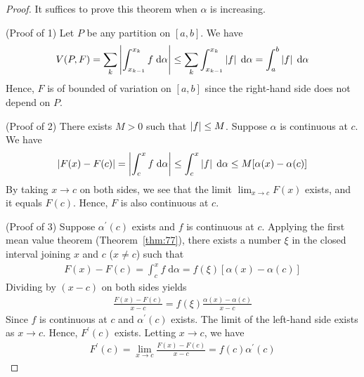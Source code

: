 \documentclass[thmcnt=section, 12pt]{my-elegantbook}
\begin{document}
\begin{proof}
    It suffices to prove this theorem when $\alpha$ is increasing.

    (Proof of 1) Let $P$ be any partition on $[a, b]$.
    We have
    \begin{align*}
        V(P,F) = \sum_{k} \left\lvert 
            \int_{x_{k-1}}^{x_k} f \; \mathrm{d} \alpha
         \right\rvert
        \leq \sum_{k}
        \int_{x_{k-1}}^{x_k} \left\lvert f \right\rvert \; \mathrm{d} \alpha
        = \int_{a}^{b} \left\lvert f \right\rvert \; \mathrm{d} \alpha
    \end{align*}
    Hence, $F$ is of bounded of variation on $[a, b]$
    since the right-hand side does not depend on $P$.

    (Proof of 2) There exists $M > 0$ such that $\left\lvert f \right\rvert \leq M$.
    Suppose $\alpha$ is continuous at $c$.
    We have
    \begin{align*}
        \left\lvert F(x) - F(c) \right\rvert
        = \left\lvert 
            \int_c^x f \; \mathrm{d} \alpha
         \right\rvert \leq \int_c^x \left\lvert f \right\rvert \; \mathrm{d} \alpha
        \leq M [
                \alpha(x) - \alpha(c)
            ]
    \end{align*}
    By taking $x \to c$ on both sides, we see that
    the limit $\lim_{x \to c} F(x)$ exists, and it equals $F(c)$.
    Hence, $F$ is also continuous at $c$.

    (Proof of 3) Suppose $\alpha^\prime(c)$ exists and $f$ is
    continuous at $c$.
    Applying the first mean value theorem (Theorem~\ref{thm:77}),
    there exists a number $\xi$ in the closed interval
    joining $x$ and $c$ ($x \neq c$) such that
    \begin{align*}
        F(x) - F(c)
        = \int_c^x f \; \mathrm{d} \alpha
        = f(\xi) [ \alpha(x) - \alpha(c) ]
    \end{align*}
    Dividing by $(x - c)$ on both sides yields
    \begin{align*}
        \frac{F(x) - F(c)}{x - c}
        = f(\xi) \frac{\alpha(x) - \alpha(c)}{x - c}
    \end{align*}
    Since $f$ is continuous at $c$ and $\alpha^\prime(c)$ exists.
    The limit of the left-hand side exists as $x \to c$.
    Hence, $F^\prime(c)$ exists.
    Letting $x \to c$, we have
    \begin{align*}
        F^\prime(c) = \lim_{x \to c} \frac{F(x) - F(c)}{x - c}
        = f(c) \alpha^\prime(c)
    \end{align*}
\end{proof}

\end{document}
